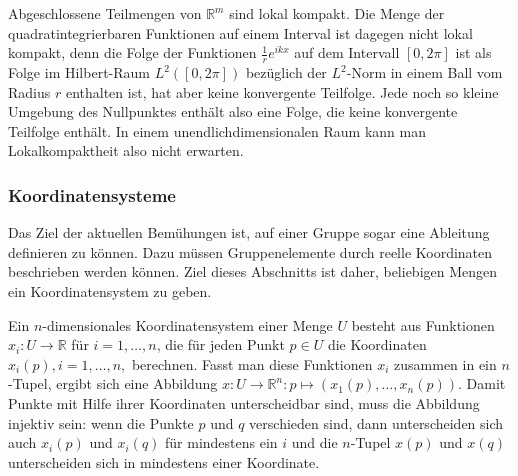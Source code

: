 Abgeschlossene Teilmengen von $\mathbb{R}^m$ sind lokal kompakt.
Die Menge der quadratintegrierbaren Funktionen auf einem Interval
ist dagegen nicht lokal kompakt, denn
die Folge der Funktionen $\frac1r e^{ikx}$ auf dem Intervall $[0,2\pi]$ ist
als Folge im Hilbert-Raum $L^2([0,2\pi])$ 
bezüglich der $L^2$-Norm in einem Ball vom Radius $r$ enthalten ist,
hat aber keine konvergente Teilfolge.
Jede noch so kleine Umgebung des Nullpunktes enthält also eine Folge,
die keine konvergente Teilfolge enthält.
In einem unendlichdimensionalen Raum kann man Lokalkompaktheit
also nicht erwarten.

%
%
\subsubsection{Koordinatensysteme}
Das Ziel der aktuellen Bemühungen ist, auf einer Gruppe sogar eine
Ableitung definieren zu können.
Dazu müssen Gruppenelemente durch reelle Koordinaten beschrieben werden
können.
Ziel dieses Abschnitts ist daher, beliebigen Mengen ein Koordinatensystem
zu geben.

Ein $n$-dimensionales Koordinatensystem einer Menge $U$ besteht
aus Funktionen $x_i\colon U\to\mathbb{R}$ für $i=1,\dots,n$, die für
jeden Punkt $p\in U$ die Koordinaten $x_i(p),i=1,\dots,n,$ berechnen.
Fasst man diese Funktionen $x_i$ zusammen in ein $n$-Tupel, ergibt
sich eine Abbildung $x\colon U\to\mathbb{R}^n:p\mapsto (x_1(p),\dots,x_n(p))$.
Damit Punkte mit Hilfe ihrer Koordinaten unterscheidbar sind, muss
die Abbildung injektiv sein: wenn die Punkte $p$ und $q$ verschieden sind,
dann unterscheiden sich auch $x_i(p)$ und $x_i(q)$ für mindestens ein $i$
und die $n$-Tupel $x(p)$ und $x(q)$ unterscheiden sich in mindestens
einer Koordinate.


